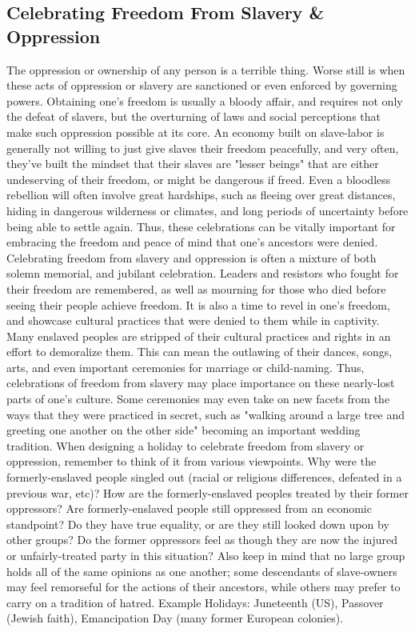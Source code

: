\documentclass[10pt,a4paper,twoside,bg=print,twocolumn,openany,nodeprecatedcode]{dndbook}
\begin{document}
\subsection{Celebrating Freedom From Slavery \& Oppression}
The oppression or ownership of any person is a terrible thing. Worse still is when these acts of oppression or slavery are sanctioned or even enforced by governing powers. Obtaining one's freedom is usually a bloody affair, and requires not only the defeat of slavers, but the overturning of laws and social perceptions that make such oppression possible at its core. An economy built on slave-labor is generally not willing to just give slaves their freedom peacefully, and very often, they've built the mindset that their slaves are "lesser beings" that are either undeserving of their freedom, or might be dangerous if freed.
Even a bloodless rebellion will often involve great hardships, such as fleeing over great distances, hiding in dangerous wilderness or climates, and long periods of uncertainty before being able to settle again. Thus, these celebrations can be vitally important for embracing the freedom and peace of mind that one's ancestors were denied.
Celebrating freedom from slavery and oppression is often a mixture of both solemn memorial, and jubilant celebration. Leaders and resistors who fought for their freedom are remembered, as well as mourning for those who died before seeing their people achieve freedom. It is also a time to revel in one's freedom, and showcase cultural practices that were denied to them while in captivity. Many enslaved peoples are stripped of their cultural practices and rights in an effort to demoralize them. This can mean the outlawing of their dances, songs, arts, and even important ceremonies for marriage or child-naming. Thus, celebrations of freedom from slavery may place importance on these nearly-lost parts of one's culture. Some ceremonies may even take on new facets from the ways that they were practiced in secret, such as "walking around a large tree and greeting one another on the other side" becoming an important wedding tradition.
When designing a holiday to celebrate freedom from slavery or oppression, remember to think of it from various viewpoints. Why were the formerly-enslaved people singled out (racial or religious differences, defeated in a previous war, etc)? How are the formerly-enslaved peoples treated by their former oppressors? Are formerly-enslaved people still oppressed from an economic standpoint? Do they have true equality, or are they still looked down upon by other groups? Do the former oppressors feel as though they are now the injured or unfairly-treated party in this situation? Also keep in mind that no large group holds all of the same opinions as one another; some descendants of slave-owners may feel remorseful for the actions of their ancestors, while others may prefer to carry on a tradition of hatred.
Example Holidays: Juneteenth (US), Passover (Jewish faith), Emancipation Day (many former European colonies).
\end{document}
